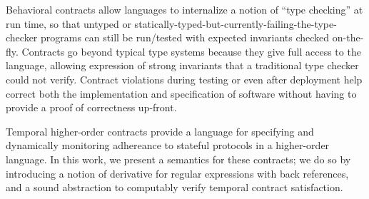 Behavioral contracts allow languages to internalize a notion of ``type checking'' at run time, so that untyped or statically-typed-but-currently-failing-the-type-checker programs can still be run/tested with expected invariants checked on-the-fly.
%
Contracts go beyond typical type systems because they give full access to the language, allowing expression of strong invariants that a traditional type checker could not verify.
%
Contract violations during testing or even after deployment help correct both the implementation and specification of software without having to provide a proof of correctness up-front.

Temporal higher-order contracts provide a language for specifying and dynamically monitoring adhereance to stateful protocols in a higher-order language.
%
In this work, we present a semantics for these contracts; we do so by introducing a notion of derivative for regular expressions with back references, and a sound abstraction to computably verify temporal contract satisfaction.